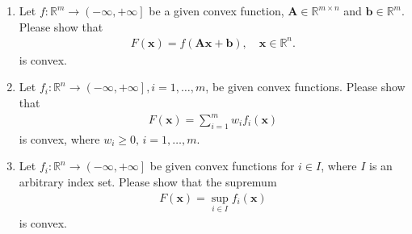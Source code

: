 \documentclass[11pt,letter,notitlepage]{article}
\begin{document}
\newpage
\begin{exercise}

        \begin{enumerate}
            \item Let $f:\mathbb{R}^m \rightarrow \left( -\infty,+\infty \right]$ be a given convex function, $\mathbf{A}\in \mathbb{R}^{m \times n}$ and $\mathbf{b} \in \mathbb{R}^m$. Please show that
        \begin{align*}
            F(\mathbf{x}) = f(\mathbf{Ax+b}),\quad\mathbf{x}\in\mathbb{R}^n.
        \end{align*}
        is convex.
        \item Let $f_i:\mathbb{R}^n \rightarrow \left(-\infty,+\infty \right],i=1,\dots,m$, be given convex functions. Please show that
        \begin{align*}
            F(\mathbf{x}) = \sum_{i=1}^m w_if_i(\mathbf{x})
        \end{align*}
        is convex, where $w_i \geq 0,\,i=1,\dots,m$.

        \item
            Let $f_i:\mathbb{R}^n \rightarrow \left(-\infty,+\infty \right]$ be given convex functions for $i \in I$, where $I$ is an arbitrary index set. Please show that the supremum
            \begin{align*}
                F(\mathbf{x}) = \sup_{i\in I}f_i(\mathbf{x})
            \end{align*}
            is convex.




\end{enumerate}
\end{exercise}
\end{document}
